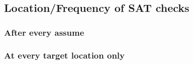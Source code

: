 \subsection{Location/Frequency of SAT checks}
\subsubsection{After every assume}
\subsubsection{At every target location only}
